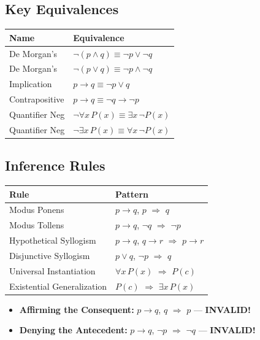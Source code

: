 \documentclass[11pt,a4paper]{article}
\begin{document}
\subsection*{Key Equivalences}

\begin{center}
\begin{tabular}{l|l}
\toprule
\textbf{Name} & \textbf{Equivalence} \\
\midrule
De Morgan's & $\neg(p \land q) \equiv \neg p \lor \neg q$ \\
De Morgan's & $\neg(p \lor q) \equiv \neg p \land \neg q$ \\
Implication & $p \to q \equiv \neg p \lor q$ \\
Contrapositive & $p \to q \equiv \neg q \to \neg p$ \\
Quantifier Neg & $\neg \forall x\, P(x) \equiv \exists x\, \neg P(x)$ \\
Quantifier Neg & $\neg \exists x\, P(x) \equiv \forall x\, \neg P(x)$ \\
\bottomrule
\end{tabular}
\end{center}

\subsection*{Inference Rules}

\begin{center}
\begin{tabular}{l|l}
\toprule
\textbf{Rule} & \textbf{Pattern} \\
\midrule
Modus Ponens & $p \to q$, $p$ $\Rightarrow$ $q$ \\
Modus Tollens & $p \to q$, $\neg q$ $\Rightarrow$ $\neg p$ \\
Hypothetical Syllogism & $p \to q$, $q \to r$ $\Rightarrow$ $p \to r$ \\
Disjunctive Syllogism & $p \lor q$, $\neg p$ $\Rightarrow$ $q$ \\
Universal Instantiation & $\forall x\, P(x)$ $\Rightarrow$ $P(c)$ \\
Existential Generalization & $P(c)$ $\Rightarrow$ $\exists x\, P(x)$ \\
\bottomrule
\end{tabular}
\end{center}

\vspace{1cm}

\begin{tipbox}
\begin{itemize}[noitemsep]
    \item \textbf{Affirming the Consequent:} $p \to q$, $q$ $\Rightarrow$ $p$ --- \textbf{INVALID!}
    \item \textbf{Denying the Antecedent:} $p \to q$, $\neg p$ $\Rightarrow$ $\neg q$ --- \textbf{INVALID!}
\end{itemize}
\end{tipbox}
\end{document}
